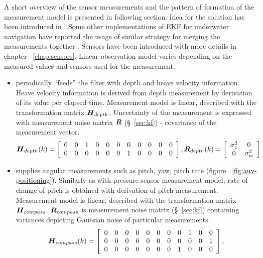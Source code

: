 A short overview of the sensor measurements and the pattern of formation of the measurement model is presented in following section. Idea for the solution has been introduced in \cite{ribas10}. Some other implementations of EKF for underwater navigation have reported the usage of similar strategy for merging the measurements together \cite{drolet00, blain03}. Sensors have been introduced with more details in chapter ~\ref{chap:sensors}. Linear observation model varies depending on the measured values and sensors used for the measurement. 
\begin{itemize}
\item {}
periodically ``feeds'' the filter with depth and heave velocity information. Heave velocity information is derived from depth measurement by derivation of its value per elapsed time. Measurement model is linear, described with the transformation matrix $\boldsymbol{H}_{depth}$. Uncertainty of the measurement is expressed with measurement noise matrix $\boldsymbol{R}$ (\S~\ref{sec:kf}) - covariance of the measurement vector.  
\begin{equation}
\label{eq:press-mes}
\boldsymbol{H}_{depth}(k) = 
\left[ \begin{array}{ccccccccccc}
0 & 0 & 1 & 0 & 0 & 0 & 0 & 0 & 0 & 0 & 0 \\
0 & 0 & 0 & 0 & 0 & 0 & 1 & 0 & 0 & 0 & 0 \end{array} \right],
\boldsymbol{R}_{depth}(k) =  
\left[ \begin{array}{cc}
\sigma_{z}^{2} & 0 \\
0 & \sigma_{w}^{2} \end{array} \right]
\end{equation}
\item {}
supplies angular measurements such as pitch, yaw, pitch rate (figure ~\ref{fig:auv-positioning}). Similarly as with pressure sensor measurement model, rate of change of pitch is obtained with derivation of pitch measurement. Measurement model is linear, described with the transformation matrix $\boldsymbol{H}_{compass}$. $\boldsymbol{R}_{compass}$ is measurement noise matrix (\S~\ref{sec:kf}) containing variances depicting Gaussian noise of particular measurements.
\begin{equation}
\label{eq:com-mes}
\vect{H}_{compass}(k) = 
\left[ \begin{array}{ccccccccccc}
0 & 0 & 0 & 0 & 0 & 0 & 0 & 0 & 1 & 0 & 0 \\
0 & 0 & 0 & 0 & 0 & 0 & 0 & 0 & 0 & 0 & 1 \\
0 & 0 & 0 & 0 & 0 & 0 & 0 & 1 & 0 & 0 & 0 \end{array} \right], 

\end{equation}
\end{itemize}
